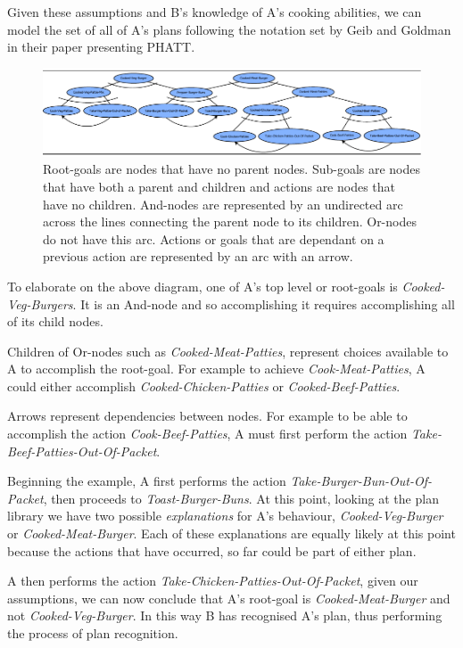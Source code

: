 \documentclass[parskip]{cs4rep}
\begin{document}
Given these assumptions and B's knowledge of A's cooking abilities, we can model the set of all of A's plans following the notation set by Geib and Goldman in their paper presenting PHATT.

\begin{figure}[h]
\centerline{
	\includegraphics{images/example-plan-library.pdf}
}
\caption{Root-goals are nodes that have no parent nodes. Sub-goals are nodes that have both a parent and children and actions are nodes that have no children. And-nodes are represented by an undirected arc across the lines connecting the parent node to its children. Or-nodes do not have this arc. Actions or goals that are dependant on a previous action are represented by an arc with an arrow.}
\label{fig:example-plan-library}
\end{figure}

To elaborate on the above diagram, one of A's top level or root-goals is \textit{Cooked-Veg-Burgers}. It is an And-node and so accomplishing it requires accomplishing all of its child nodes. 

Children of Or-nodes such as \textit{Cooked-Meat-Patties}, represent choices available to A to accomplish the root-goal. For example to achieve \textit{Cook-Meat-Patties}, A could either accomplish \textit{Cooked-Chicken-Patties} or \textit{Cooked-Beef-Patties}.

Arrows represent dependencies between nodes. For example to be able to accomplish the action \textit{Cook-Beef-Patties}, A must first perform the action \textit{Take-Beef-Patties-Out-Of-Packet}.

Beginning the example, A first performs the action \textit{Take-Burger-Bun-Out-Of-Packet}, then proceeds to \textit{Toast-Burger-Buns}. At this point, looking at the plan library we have two possible \textit{explanations} for A's behaviour, \textit{Cooked-Veg-Burger} or \textit{Cooked-Meat-Burger}. Each of these explanations are equally likely at this point because the actions that have occurred, so far could be part of either plan.

A then performs the action \textit{Take-Chicken-Patties-Out-Of-Packet}, given our assumptions, we can now conclude that A's root-goal is \textit{Cooked-Meat-Burger} and not \textit{Cooked-Veg-Burger}. In this way B has recognised A's plan, thus performing the process of plan recognition.
\end{document}
